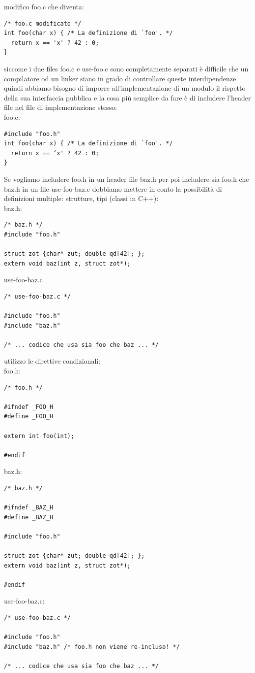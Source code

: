 \documentclass[a4paper,12pt, oneside]{book}
\begin{document}
modifico foo.c che diventa:
\begin{verbatim}
/* foo.c modificato */
int foo(char x) { /* La definizione di `foo'. */
  return x == 'x' ? 42 : 0;
}
\end{verbatim}
\newpage
siccome i due files foo.c e use-foo.c sono completamente
separati è difficile che un compilatore od un linker siano in grado di controllare queste interdipendenze quindi abbiamo bisogno di imporre all'implementazione di un modulo il
rispetto della sua interfaccia pubblica e la cosa più semplice da fare è di includere l'header file nel file di
implementazione stesso:
\\
foo.c:
\begin{verbatim}
#include "foo.h"
int foo(char x) { /* La definizione di `foo'. */
  return x == ‘x' ? 42 : 0;
}
\end{verbatim}
Se vogliamo includere foo.h in un header file baz.h per poi includere sia foo.h che baz.h in un file use-foo-baz.c dobbiamo mettere in conto la possibilità di definizioni multiple: strutture, tipi (classi in C++):
\\
baz.h:
\begin{verbatim}
/* baz.h */
#include "foo.h"

struct zot {char* zut; double qd[42]; };
extern void baz(int z, struct zot*);
\end{verbatim}
use-foo-baz.c
\begin{verbatim}
/* use-foo-baz.c */

#include "foo.h"
#include "baz.h"

/* ... codice che usa sia foo che baz ... */
\end{verbatim}
utilizzo le direttive condizionali:\\
foo.h:
\begin{verbatim}
/* foo.h */

#ifndef _FOO_H
#define _FOO_H

extern int foo(int);

#endif
\end{verbatim}
baz.h:
\begin{verbatim}
/* baz.h */

#ifndef _BAZ_H
#define _BAZ_H

#include "foo.h"

struct zot {char* zut; double qd[42]; };
extern void baz(int z, struct zot*);

#endif
\end{verbatim}
use-foo-baz.c:
\begin{verbatim}
/* use-foo-baz.c */

#include "foo.h"
#include "baz.h" /* foo.h non viene re-incluso! */

/* ... codice che usa sia foo che baz ... */
\end{verbatim}
\end{document}
